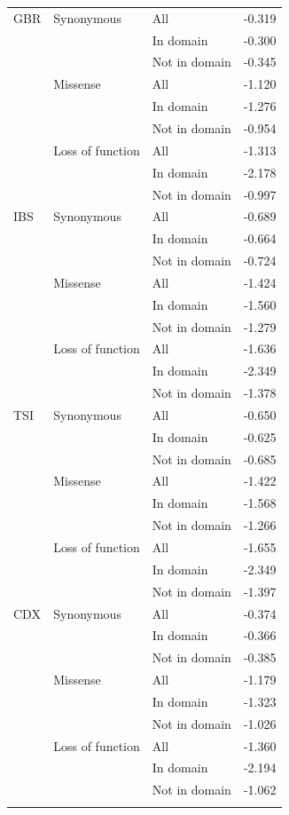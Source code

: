 \documentclass[]{article}
\begin{document}
\begin{longtable}[t]{lllr}
\addlinespace
GBR & Synonymous & All & -0.319\\
 &  & In domain & -0.300\\
 &  & Not in domain & -0.345\\
 & Missense & All & -1.120\\
 &  & In domain & -1.276\\
 &  & Not in domain & -0.954\\
 & Loss of function & All & -1.313\\
 &  & In domain & -2.178\\
 &  & Not in domain & -0.997\\
\addlinespace
IBS & Synonymous & All & -0.689\\
 &  & In domain & -0.664\\
 &  & Not in domain & -0.724\\
 & Missense & All & -1.424\\
 &  & In domain & -1.560\\
 &  & Not in domain & -1.279\\
 & Loss of function & All & -1.636\\
 &  & In domain & -2.349\\
 &  & Not in domain & -1.378\\
\addlinespace
TSI & Synonymous & All & -0.650\\
 &  & In domain & -0.625\\
 &  & Not in domain & -0.685\\
 & Missense & All & -1.422\\
 &  & In domain & -1.568\\
 &  & Not in domain & -1.266\\
 & Loss of function & All & -1.655\\
 &  & In domain & -2.349\\
 &  & Not in domain & -1.397\\
\addlinespace
CDX & Synonymous & All & -0.374\\
 &  & In domain & -0.366\\
 &  & Not in domain & -0.385\\
 & Missense & All & -1.179\\
 &  & In domain & -1.323\\
 &  & Not in domain & -1.026\\
 & Loss of function & All & -1.360\\
 &  & In domain & -2.194\\
 &  & Not in domain & -1.062\\
\addlinespace

\end{longtable}
\end{document}
